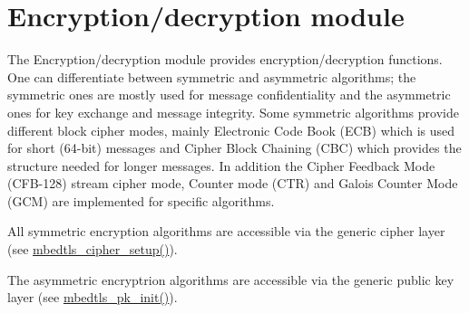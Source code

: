 \hypertarget{group__encdec__module}{\section{Encryption/decryption module}
\label{group__encdec__module}
}
The Encryption/decryption module provides encryption/decryption functions. One can differentiate between symmetric and asymmetric algorithms; the symmetric ones are mostly used for message confidentiality and the asymmetric ones for key exchange and message integrity. Some symmetric algorithms provide different block cipher modes, mainly Electronic Code Book (E\-C\-B) which is used for short (64-\/bit) messages and Cipher Block Chaining (C\-B\-C) which provides the structure needed for longer messages. In addition the Cipher Feedback Mode (C\-F\-B-\/128) stream cipher mode, Counter mode (C\-T\-R) and Galois Counter Mode (G\-C\-M) are implemented for specific algorithms.

All symmetric encryption algorithms are accessible via the generic cipher layer (see {\ttfamily \hyperlink{cipher_8h_a009056b59d69abba5843ce78cd9aae1c}{mbedtls\-\_\-cipher\-\_\-setup()}}).

The asymmetric encryptrion algorithms are accessible via the generic public key layer (see {\ttfamily \hyperlink{pk_8h_a999d1160bb30c03d0c4382c3a9b0aa89}{mbedtls\-\_\-pk\-\_\-init()}}).

